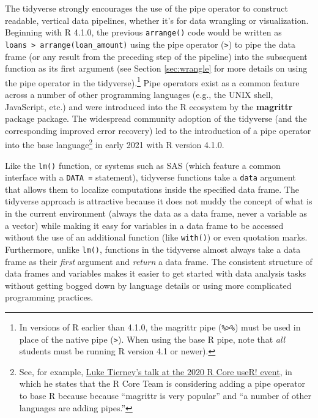 \documentclass[12pt]{article}
\begin{document}
The tidyverse strongly encourages the use of the pipe operator to
construct readable, vertical data pipelines, whether it's for data
wrangling or visualization. Beginning with R 4.1.0, the previous
\texttt{arrange()} code would be written as
\texttt{loans\ \textbar{}\textgreater{}\ arrange(loan\_amount)} using
the pipe operator (\texttt{\textbar{}\textgreater{}}) to pipe the data
frame (or any result from the preceding step of the pipeline) into the
subsequent function as its first argument (see Section \ref{sec:wrangle}
for more details on using the pipe operator in the
tidyverse).\footnote{In versions of R earlier than 4.1.0, the magrittr
  pipe (\texttt{\%\textgreater{}\%}) must be used in place of the native
  pipe (\texttt{\textbar{}\textgreater{}}). When using the base R pipe,
  note that \emph{all} students must be running R version 4.1 or newer).}
Pipe operators exist as a common feature across a number of other
programming languages (e.g., the UNIX shell, JavaScript, etc.) and were
introduced into the R ecosystem by the \textbf{magrittr} package
\citep{R-magrittr} package. The widespread community adoption of the
tidyverse (and the corresponding improved error recovery) led to the
introduction of a pipe operator into the base language\footnote{See, for
  example,
  \href{https://www.youtube.com/watch?v=X_eDHNVceCU\&t=4085s}{Luke
  Tierney's talk at the 2020 R Core useR! event}, in which he states
  that the R Core Team is considering adding a pipe operator to base R
  because because ``magrittr is very popular'' and ``a number of other
  languages are adding pipes.''} in early 2021 with R version 4.1.0.

Like the \texttt{lm()} function, or systems such as SAS (which feature a
common interface with a \texttt{DATA\ =} statement), tidyverse functions
take a \texttt{data} argument that allows them to localize computations
inside the specified data frame. The tidyverse approach is attractive
because it does not muddy the concept of what is in the current
environment (always the data as a data frame, never a variable as a
vector) while making it easy for variables in a data frame to be
accessed without the use of an additional function (like
\texttt{with()}) or even quotation marks. Furthermore, unlike
\texttt{lm()}, functions in the tidyverse almost always take a data
frame as their \emph{first} argument and \emph{return} a data frame. The
consistent structure of data frames and variables makes it easier to get
started with data analysis tasks without getting bogged down by language
details or using more complicated programming practices.
\end{document}
